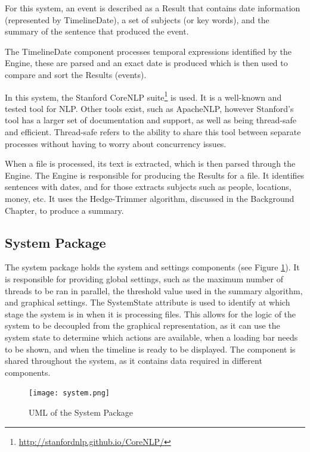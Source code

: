 \par For this system, an event is described as a Result that contains date information (represented by TimelineDate), a set of subjects (or key words), and the summary of the sentence that produced the event.
\par The TimelineDate component processes temporal expressions identified by the Engine, these are parsed and an exact date is produced which is then used to compare and sort the Results (events).
\par In this system, the Stanford CoreNLP suite\footnote{\url{http://stanfordnlp.github.io/CoreNLP/}} is used. It is a well-known and tested tool for NLP. Other tools exist, such as ApacheNLP, however Stanford's tool has a larger set of documentation and support, as well as being thread-safe and efficient. Thread-safe refers to the ability to share this tool between separate processes without having to worry about concurrency issues. 
\par When a file is processed, its text is extracted, which is then parsed through the Engine. The Engine is responsible for producing the Results for a file. It identifies sentences with dates, and for those extracts subjects such as people, locations, money, etc. It uses the Hedge-Trimmer algorithm, discussed in the Background Chapter, to produce a summary.

\subsection{System Package}
\par The system package holds the system and settings components (see Figure \ref{fig:system}). It is responsible for providing global settings, such as the maximum number of threads to be ran in parallel, the threshold value used in the summary algorithm, and graphical settings. The SystemState attribute is used to identify at which stage the system is in when it is processing files. This allows for the logic of the system to be decoupled from the graphical representation, as it can use the system state to determine which actions are available, when a loading bar needs to be shown, and when the timeline is ready to be displayed. The component is shared throughout the system, as it contains data required in different components.
\begin{figure}[H]
\caption{UML of the System Package}
\label{fig:system}
\texttt{[image: system.png]}
\centering
\end{figure}


